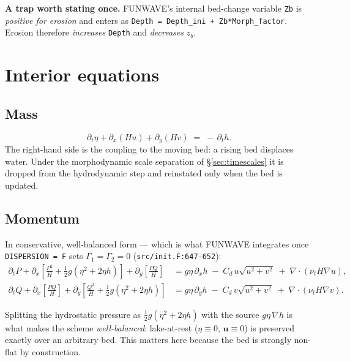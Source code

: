 \documentclass[11pt,a4paper]{article}
\newcommand{\dt}{\partial_t}
\newcommand{\dx}{\partial_x}
\newcommand{\dy}{\partial_y}
\newcommand{\code}[1]{\texttt{\small #1}}
\begin{document}
\noindent
\textbf{A trap worth stating once.} FUNWAVE's internal bed-change variable \code{Zb} is
\emph{positive for erosion} and enters as \code{Depth = Depth\_ini + Zb*Morph\_factor}.
Erosion therefore \emph{increases} \code{Depth} and \emph{decreases} $z_b$.

\section{Interior equations}

\subsection{Mass}
\begin{equation}
  \dt\eta + \dx(Hu) + \dy(Hv) \;=\; -\,\dt h .
  \label{eq:mass}
\end{equation}
The right-hand side is the coupling to the moving bed: a rising bed displaces water. Under
the morphodynamic scale separation of \S\ref{sec:timescales} it is dropped from the
hydrodynamic step and reinstated only when the bed is updated.

\subsection{Momentum}
In conservative, well-balanced form --- which is what FUNWAVE integrates once
\code{DISPERSION = F} sets $\Gamma_1=\Gamma_2=0$ (\code{src/init.F:647-652}):
\begin{align}
  \dt P + \dx\!\left[\frac{P^2}{H} + \tfrac12 g\!\left(\eta^2+2\eta h\right)\right]
        + \dy\!\left[\frac{PQ}{H}\right]
  &= g\eta\,\dx h \;-\; C_d\,u\sqrt{u^2+v^2} \;+\; \nabla\!\cdot\!\left(\nu_t H\nabla u\right),
  \label{eq:momx}\\[2pt]
  \dt Q + \dx\!\left[\frac{PQ}{H}\right]
        + \dy\!\left[\frac{Q^2}{H} + \tfrac12 g\!\left(\eta^2+2\eta h\right)\right]
  &= g\eta\,\dy h \;-\; C_d\,v\sqrt{u^2+v^2} \;+\; \nabla\!\cdot\!\left(\nu_t H\nabla v\right).
  \label{eq:momy}
\end{align}

Splitting the hydrostatic pressure as $\tfrac12 g(\eta^2+2\eta h)$ with the source
$g\eta\,\nabla h$ is what makes the scheme \emph{well-balanced}: lake-at-rest
($\eta\equiv0$, $\bm u\equiv 0$) is preserved exactly over an arbitrary bed. This matters
here because the bed is strongly non-flat by construction.
\end{document}
